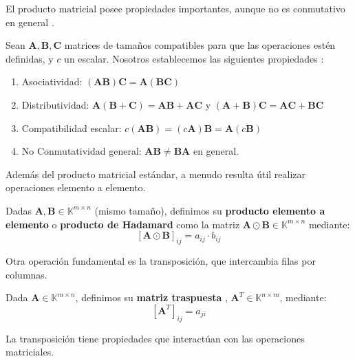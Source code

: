 El producto matricial posee propiedades importantes, aunque no es conmutativo en general \citep{Strang2016}.

\begin{proposition}
\label{prop:matrix_product_properties_general}
Sean $\mathbf{A}, \mathbf{B}, \mathbf{C}$ matrices de tamaños compatibles para que las operaciones estén definidas, y $c$ un escalar. Nosotros establecemos las siguientes propiedades \citep{Noble1988}:
\begin{enumerate}
    \item Asociatividad: $(\mathbf{A}\mathbf{B})\mathbf{C} = \mathbf{A}(\mathbf{B}\mathbf{C})$
    \item Distributividad: $\mathbf{A}(\mathbf{B}+\mathbf{C}) = \mathbf{A}\mathbf{B} + \mathbf{A}\mathbf{C}$ y $(\mathbf{A}+\mathbf{B})\mathbf{C} = \mathbf{A}\mathbf{C} + \mathbf{B}\mathbf{C}$
    \item Compatibilidad escalar: $c(\mathbf{A}\mathbf{B}) = (c\mathbf{A})\mathbf{B} = \mathbf{A}(c\mathbf{B})$
    \item No Conmutatividad general: $\mathbf{A}\mathbf{B} \neq \mathbf{B}\mathbf{A}$ en general.
\end{enumerate}
\end{proposition}

Además del producto matricial estándar, a menudo resulta útil realizar operaciones elemento a elemento.

\begin{definition}
\label{def:hadamard_product_general}
Dadas $\mathbf{A}, \mathbf{B} \in \mathbb{K}^{m \times n}$ (mismo tamaño), definimos su \textbf{producto elemento a elemento} o \textbf{producto de Hadamard} como la matriz $\mathbf{A} \odot \mathbf{B} \in \mathbb{K}^{m \times n}$ mediante:
\[ [\mathbf{A} \odot \mathbf{B}]_{ij} = a_{ij} \cdot b_{ij} \]
\end{definition}

Otra operación fundamental es la transposición, que intercambia filas por columnas.

\begin{definition}
\label{def:transpose_general}
Dada $\mathbf{A} \in \mathbb{K}^{m \times n}$, definimos su \textbf{matriz traspuesta} \citep{Strang2016}, $\mathbf{A}^T \in \mathbb{K}^{n \times m}$, mediante:
\[ [\mathbf{A}^T]_{ij} = a_{ji} \]
\end{definition}

La transposición tiene propiedades que interactúan con las operaciones matriciales.

